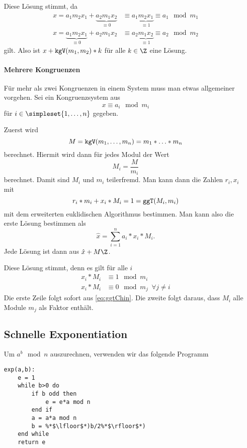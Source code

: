 \bigskip

Diese Lösung stimmt, da
\begin{align*}
	x=a_1m_2x_1+\underbrace{a_2m_1x_2}_{\equiv 0}
	&\equiv a_1\underbrace{m_2x_1}_{\equiv 1}\equiv a_1 \mod m_1\\
	x=\underbrace{a_1m_2x_1}_{\equiv 0}+a_2m_1x_2
	&\equiv a_2\underbrace{m_1x_2}_{\equiv 1} \equiv a_2\mod m_2
\end{align*}
gilt. Also ist $x+\texttt{kgV}(m_1,m_2)*k$ für alle $k\in\Z$ eine Lösung.



\paragraph{Mehrere Kongruenzen}
Für mehr als zwei Kongruenzen in einem System muss man etwas allgemeiner vorgehen.
Sei ein Kongruenzsystem aus 
\begin{equation*}
	x\equiv a_i\mod m_i
\end{equation*}
für $i\in\simpleset{1,\ldots,n}$ gegeben.

Zuerst wird
\begin{equation*}
	M=\texttt{kgV}(m_1,\ldots,m_n)=m_1*\ldots*m_n
\end{equation*}
berechnet.
Hiermit wird dann für jedes Modul der Wert
\begin{equation*}
	M_i=\frac M{m_i}
\end{equation*}
berechnet. Damit sind $M_i$ und $m_i$ teilerfremd. Man kann dann die Zahlen $r_i,x_i$ mit 
\begin{equation}
	r_i*m_i+x_i*M_i=1=\texttt{ggT}(M_i,m_i)\label{eq:ggtChin}
\end{equation}
mit dem erweiterten euklidischen Algorithmus bestimmen. 
Man kann also die erste Lösung bestimmen als
\begin{equation*}
	\hat x=\sum_{i=1}^n a_i*x_i*M_i.
\end{equation*}
Jede Lösung ist dann aus $\hat x+M\Z$.

\bigskip

Diese Lösung stimmt, denn es gilt für alle $i$
\begin{align*}
	x_i*M_i&\equiv 1\mod m_i\\
	x_i*M_i&\equiv 0\mod m_j\enspace \forall j\neq i
\end{align*}
Die erste Zeile folgt sofort aus \autoref{eq:ggtChin}. Die zweite folgt daraus, dass $M_i$ alle Module $m_j$ als Faktor enthält.

\subsection{Schnelle Exponentiation}
Um $a^b\mod n$ auszurechnen, verwenden wir das folgende Programm
\begin{lstlisting}
exp(a,b):
	e = 1
	while b>0 do
		if b odd then
			e = e*a mod n
		end if
		a = a*a mod n
		b = %*$\lfloor$*)b/2%*$\rfloor$*)
	end while
	return e
\end{lstlisting}

